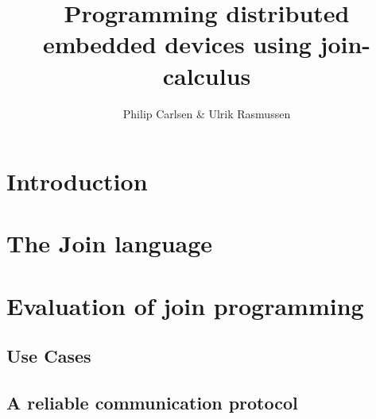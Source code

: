 \documentclass[a4paper, oneside, draft]{memoir}
\title{Programming distributed embedded devices using join-calculus}
\author{Philip Carlsen \& Ulrik Rasmussen}
\begin{document}

\lstset{language=join,
        basicstyle=\small
}

\frontmatter

\maketitle
\iffalse
\begin{abstract}

\end{abstract}

\clearpage
\chapter*{Preface}


\clearpage

\tableofcontents*

\fi
\mainmatter

\chapter{Introduction}


\chapter{The Join language}


\chapter{Evaluation of join programming}

\section{Use Cases}

\section{A reliable communication protocol}





\end{document}
